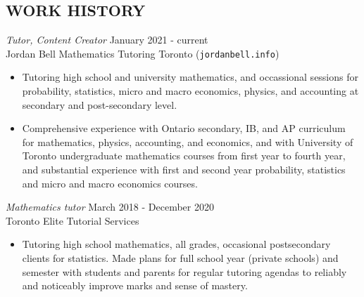 \documentclass[margin, 10pt]{res} %
\begin{document}
\begin{resume}

 



 
\section{WORK HISTORY}

{\sl Tutor, Content Creator} \hfill January 2021 - current \\
Jordan Bell Mathematics Tutoring Toronto (\texttt{jordanbell.info})

\begin{itemize} \itemsep -2pt %
\item Tutoring high school and university mathematics, and occassional sessions for
probability, statistics, micro and macro economics, physics, and accounting at secondary and post-secondary level.

\item Comprehensive experience with Ontario secondary, IB, and AP curriculum for mathematics, physics, accounting, and economics, and with University of Toronto undergraduate mathematics courses from first year to fourth year, and substantial experience with first and second year probability, statistics and micro and macro economics courses.
\end{itemize}

{\sl Mathematics tutor} \hfill March 2018 - December 2020 \\
Toronto Elite Tutorial Services

\begin{itemize} \itemsep -2pt %
\item Tutoring high school mathematics, all grades, occasional postsecondary clients for statistics. Made plans for full school year (private schools) and semester with students and parents for regular tutoring agendas to reliably and noticeably improve marks and sense of mastery. 
\end{itemize}


\end{resume}
\end{document}

